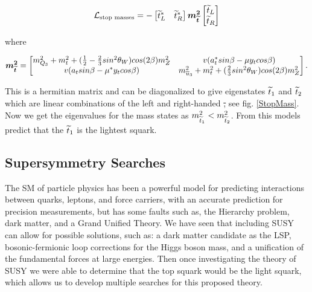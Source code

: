 \begin{equation}
\mathcal{L}_{\text{stop masses}}=-
\begin{bmatrix}
\widetilde{t}^*_L & \widetilde{t}^*_R \\
\end{bmatrix}
\boldsymbol{m_{\widetilde{t}}^2}
\begin{bmatrix}
\widetilde{t}_L \\
\widetilde{t}_R \\
\end{bmatrix}
\end{equation}

where 

\begin{equation}
\boldsymbol{m_{\widetilde{t}}^2}=
\begin{bmatrix}
m_{Q_3}^2+m_t^2+(\frac{1}{2}-\frac{2}{3}sin^2\theta_W)cos(2\beta)m_Z^2 & v(a_t^*sin\beta-\mu y_tcos\beta) \\
v(a_tsin\beta-\mu^*y_tcos\beta) & m^2_{\overline{u}_3} +m_t^2+(\frac{2}{3}sin^2\theta_W)cos(2\beta)m^2_Z \\ 
\end{bmatrix}.
\end{equation}

This is a hermitian matrix and can be diagonalized to give eigenstates $\widetilde{t}_1$ and $\widetilde{t}_2$ which are linear combinations of the left and right-handed \st, see fig. \ref{StopMass}. Now we get the eigenvalues for the mass states as $m_{\widetilde{t}_1}^2<m_{\widetilde{t}_2}^2$. From this models predict that the $\widetilde{t}_1$ is the lightest squark. 

\subsection{Supersymmetry Searches}
The SM of particle physics has been a powerful model for predicting interactions between quarks, leptons, and force carriers, with an accurate prediction for precision measurements, but has some faults such as, the Hierarchy problem, dark matter, and a Grand Unified Theory. We have seen that including SUSY can allow for possible solutions, such as: a dark matter candidate as the LSP, bosonic-fermionic loop corrections for the Higgs boson mass, and a unification of the fundamental forces at large energies. Then once investigating the theory of SUSY we were able to determine that the top squark would be the light squark, which allows us to develop multiple searches for this proposed theory. 
